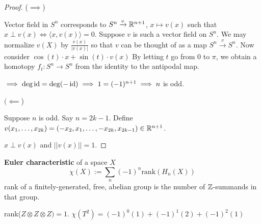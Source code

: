 \documentclass[12pt]{amsart}
\begin{document}
\begin{proof}
    ($\implies$)
    
    Vector field in $S^n$ corresponds to $S^n \xrightarrow{v} \mathbb R^{n+1}$, $x \mapsto v(x)$ such that $x \perp v(x) \iff \langle x, v(x) \rangle = 0$. Suppose $v$ is such a vector field on $S^n$. We may normalize $v(X)$ by $\frac{v(x)}{|v(x)|}$ so that $v$ can be thought of as a map $S^n \xrightarrow{v} S^n$. Now consider $\cos(t) \cdot x + \sin (t) \cdot v(x)$ By letting $t$ go from $0$ to $\pi$, we obtain a homotopy $f_t: S^n \to S^n$ from the identity to the antipodal map. 

    $\implies \deg \operatorname{id} = \deg (-\operatorname{id}) \implies 1 = (-1)^{n+1} \implies n$ is odd.  

    $(\impliedby$) 

    Suppose $n$ is odd. Say $n = 2k - 1$. Define $v(x_1, \ldots, x_{2k}) = (-x_2, x_1, \ldots, -x_{2k}, x_{2k-1}) \in \mathbb R^{n+1}$. 
    
    $x \perp v(x)$ and $||v(x) || = 1$. 
\end{proof}

\begin{definition}
    \textbf{Euler characteristic} of a space $X$ 
    \[\chi(X):= \sum_n (-1)^n \text{rank}(H_n(X))\]
    rank of a finitely-generated, free, abelian group is the number of $\mathbb Z$-summands in that group. 

    \begin{example}
        rank($Z \otimes Z \otimes Z) = 1$. $\chi(T^2) = (-1)^0 (1) + (-1)^1 (2) + (-1)^2 (1)$
    \end{example}
\end{definition}
\end{document}
